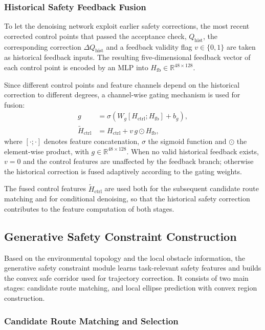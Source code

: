\documentclass[journal]{IEEEtran}
\newcommand{\R}{\mathbb{R}}
\newcommand{\ctrl}{H_{\mathrm{ctrl}}}
\newcommand{\ctrlf}{\widetilde{H}_{\mathrm{ctrl}}}
\begin{document}
\subsubsection{Historical Safety Feedback Fusion}

To let the denoising network exploit earlier safety corrections, the most
recent corrected control points that passed the acceptance check,
$Q_{\mathrm{hist}}$, the corresponding correction $\Delta Q_{\mathrm{hist}}$
and a feedback validity flag $v\in\{0,1\}$ are taken as historical feedback
inputs. The resulting five-dimensional feedback vector of each control point is
encoded by an MLP into
$H_{\mathrm{fb}}\in\R^{48\times128}$.

Since different control points and feature channels depend on the historical
correction to different degrees, a channel-wise gating mechanism is used for
fusion:
\begin{equation}
\begin{aligned}
g&=\sigma\!\left(W_g[\ctrl;H_{\mathrm{fb}}]+b_g\right),\\
\ctrlf&=\ctrl+v\,g\odot H_{\mathrm{fb}},
\end{aligned}
\end{equation}
where $[\cdot;\cdot]$ denotes feature concatenation, $\sigma$ the sigmoid
function and $\odot$ the element-wise product, with
$g\in\R^{48\times128}$. When no valid historical feedback exists, $v=0$ and
the control features are unaffected by the feedback branch; otherwise the
historical correction is fused adaptively according to the gating weights.

The fused control features $\ctrlf$ are used both for the subsequent candidate
route matching and for conditional denoising, so that the historical safety
correction contributes to the feature computation of both stages.

\subsection{Generative Safety Constraint Construction}

Based on the environmental topology and the local obstacle information, the
generative safety constraint module learns task-relevant safety features and
builds the convex safe corridor used for trajectory correction. It consists of
two main stages: candidate route matching, and local ellipse prediction with
convex region construction.

\subsubsection{Candidate Route Matching and Selection}
\end{document}
